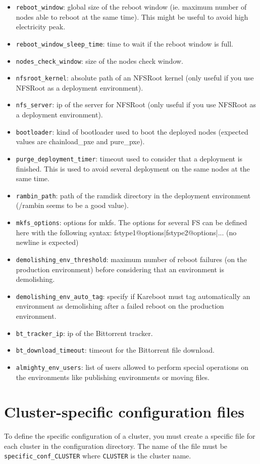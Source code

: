 \documentclass[a4wide,10pt,oneside]{book}
\begin{document}
\begin{itemize}
\item \texttt{reboot\_window}: global size of the reboot window (ie. maximum number of nodes able to reboot at the same time). This might be useful to avoid high electricity peak.
\item \texttt{reboot\_window\_sleep\_time}: time to wait if the reboot window is full.
\item \texttt{nodes\_check\_window}: size of the nodes check window.
\item \texttt{nfsroot\_kernel}: absolute path of an NFSRoot kernel (only useful if you use NFSRoot as a deployment environment).
\item \texttt{nfs\_server}: ip of the server for NFSRoot (only useful if you use NFSRoot as a deployment environment).
\item \texttt{bootloader}: kind of bootloader used to boot the deployed nodes (expected values are chainload\_pxe and pure\_pxe).
\item \texttt{purge\_deployment\_timer}: timeout used to consider that a deployment is finished. This is used to avoid several deployment on the same nodes at the same time.
\item \texttt{rambin\_path}: path of the ramdisk directory in the deployment environment (/rambin seems to be a good value).
\item \texttt{mkfs\_options}: options for mkfs. The options for several FS can be defined here with the following syntax: fstype1@options|fstype2@options|... (no newline is expected)
\item \texttt{demolishing\_env\_threshold}: maximum number of reboot failures (on the production environment) before considering that an environment is demolishing.
\item \texttt{demolishing\_env\_auto\_tag}: specify if Kareboot must tag automatically an environment as demolishing after a failed reboot on the production environment.
\item \texttt{bt\_tracker\_ip}: ip of the Bittorrent tracker.
\item \texttt{bt\_download\_timeout}: timeout for the Bittorrent file download.
\item \texttt{almighty\_env\_users}: list of users allowed to perform special operations on the environments like publishing environments or moving files.
\end{itemize}

\section{Cluster-specific configuration files}\label{sec:specific_config}
To define the specific configuration of a cluster, you must create a specific file for each cluster in the configuration directory. The name of the file must be \texttt{specific\_conf\_CLUSTER} where \texttt{CLUSTER} is the cluster name.
\end{document}
